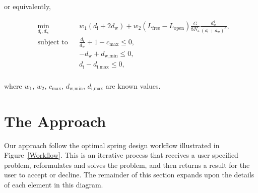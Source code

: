 \documentclass[10pt]{article}
\begin{document}
or equivalently,

\begin{equation*}
 					\begin{aligned}
 						& \underset{d_{\text{i}}, d_{\text{w}}}{\text{min}}
 						& & w_{1}(d_{\text{i}} + 2d_{\text{w}}) + w_{2}(L_{\text{free}}-L_{\text{open}})\frac{G}{8N_{\text{a}}}\frac{d_{\text{w}}^{4}}{(d_{\text{i}} + d_{\text{w}})^{3}}, \\
 						& \text{subject to}
						& & \frac{d_{\text{i}}}{d_{\text{w}}} + 1 - c_{\text{max}}\le 0, \\
						&
 						& & -d_{\text{w}} + d_{\text{w,min}} \le 0, \\
					 	&
						& & d_{\text{i}} - d_{\text{i,max}} \le 0, \\
 					\end{aligned}
				\end{equation*}		

where $w_{1}$, $w_{2}$, $c_{\text{max}}$, $d_{\text{w,min}}$, $d_{\text{i,max}}$ are known values.

\section{The Approach}
\label{sec:The_Approach}

Our approach follow the optimal spring design workflow illustrated in Figure~\ref{Workflow}. This is an iterative process that receives a user specified problem, reformulates and solves the problem, and then returns a result for the user to accept or decline. The remainder of this section expands upon the details of each element in this diagram.
\end{document}
